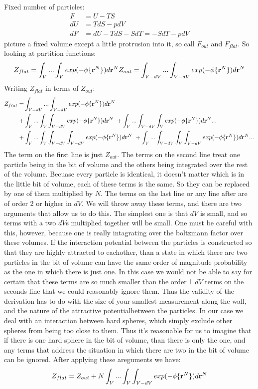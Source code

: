 Fixed number of particles:
\begin{align}
F &= U - TS \\
dU &= TdS -pdV \\
dF &= dU - TdS - SdT = -SdT - pdV
\end{align}
picture a fixed volume except a little protrusion into it, so call
$F_{out}$ and $F_{flat}$.  So looking at partition functions:
\begin{align}
Z_{flat} = \int_V... \int_V exp(-\phi \{\textbf{r}^N \})d\textbf{r}^N
Z_{out} =  \int_{V-dV}... \int_{V-dV} exp(-\phi \{\textbf{r}^N \})d\textbf{r}^N
\end{align}
Writing $Z_{flat}$ in terms of $Z_{out}$:
\begin{align}
Z_{flat} = &\int_{V-dV}... \int_{V-dV} exp(-\phi \{\textbf{r}^N \})d\textbf{r}^N \notag \\
+ &\int_V... \int_V \int_{V-dV} exp(-\phi \{ \textbf{r}^N \})d\textbf{r}^N \
+ \int_V ... \int_{V-dV} \int_V exp(-\phi \{ \textbf{r}^N \})d\textbf{r}^N ... \notag \\
+ &\int_V... \int_{V}\int_{V-dV} \int_{V-dV} exp(-\phi \{\textbf{r}^N \})d\textbf{r}^N \
+ \int_V... \int_{V-dV}\int_V \int_{V-dV} exp(-\phi \{\textbf{r}^N \})d\textbf{r}^N ...
\end{align}
The term on the first line is just $Z_{out}$.  The terms on the second
line treat one particle being in the bit of volume and the others
being integrated over the rest of the volume.  Becuase every particle
is identical, it doesn't matter which is in the little bit of volume,
each of these terms is the same.  So they can be replaced by one of
them multiplied by $N$.  The terms on the last line or any line after
are of order 2 or higher in $dV$.  We will throw away these terms, and
there are two arguments that allow us to do this.  The simplest one is
that $dV$ is small, and so terms with a two $dV$s multiplied together
will be small.  One must be careful with this, however, because one is
really intagrating over the boltzmann factor over these volumes.  If
the interaction potential between the particles is constructed so that
they are highly attracted to eachother, than a state in which there
are two particles in the bit of volume can have the same order of
magnitude probability as the one in which there is just one.  In this
case we would not be able to say for certain that these terms are so
much smaller than the order 1 $dV$ terms on the seconds line that we
could reasonably ignore them. Thus the validity of the derivation has
to do with the size of your smallest measurement along the wall, and
the nature of the attractive potentialbetween the particles.  In our
case we deal with an interaction between hard spheres, which simply
exclude other spheres from being too close to them.  Thus it's
reasonable for us to imagine that if there is one hard sphere in the
bit of volume, than there is only the one, and any terms that address
the situation in which there are two in the bit of volume can be
ignored.  After applying these areguments we have:
\begin{align}
  \label{eq:zflat}
  Z_{flat} = Z_{out} + N \int_V... \int_V \int_{V-dV} exp(-\phi \{ \textbf{r}^N \})d\textbf{r}^N
\end{align}

